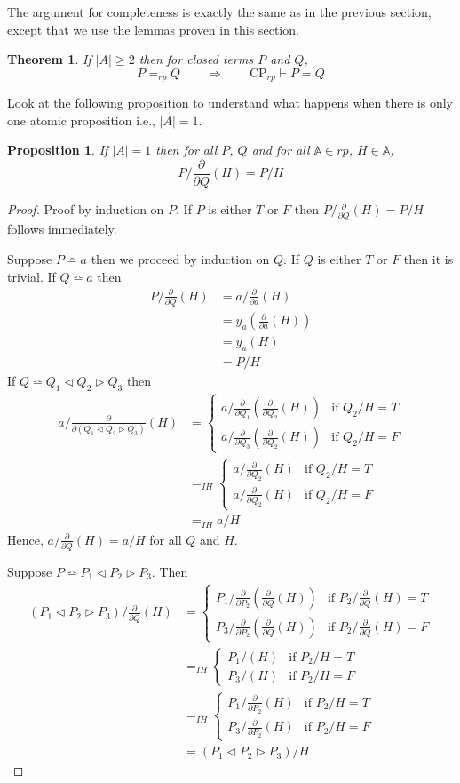\documentclass[a4paper,twoside,openright]{report}
\newcommand{\dd}[1]{\frac{\partial}{\partial #1}}
\newcommand{\syn}{\bumpeq}
\newcommand{\lef}{\ensuremath{\triangleleft}}
\newcommand{\rig}{\ensuremath{\triangleright}}
\newtheorem{prop}[theorem]{Proposition}
\newtheorem{thm}[theorem]{Theorem}
\begin{document}
The argument for completeness is exactly the same as in the previous section, except that we use the lemmas proven in this section.
\begin{thm}
If $|A|\ge 2$ then for closed terms $P$ and $Q$,
\[
P=_{rp}Q\qquad\Longrightarrow\qquad \text{CP}_{rp}\vdash P=Q
\]
\end{thm}

Look at the following proposition to understand what happens when there is only one atomic proposition i.e., $|A|=1$.
\begin{prop}\label{prop one}
If $|A|=1$ then for all $P$, $Q$ and for all $\mathbb{A}\in rp$, $H\in\mathbb{A}$,
\[
P/\dd Q(H) = P/H
\]
\end{prop}
\begin{proof}
Proof by induction on $P$. If $P$ is either $T$ or $F$ then $P/\dd Q(H)=P/H$ follows immediately.

Suppose $P\syn a$ then we proceed by induction on $Q$. If $Q$ is either $T$ or $F$ then it is trivial. If $Q\syn a$ then
\begin{align*}
P/\dd Q(H) &= a/\dd a(H)\\
&= y_a(\dd a(H))\\
&= y_a(H)\\
&= P/H
\end{align*}
If $Q\syn Q_1\lef Q_2\rig Q_3$ then
\begin{align*}
a/\dd{(Q_1\lef Q_2\rig Q_3)}(H)
&=\begin{cases}
a/\dd{Q_1}(\dd{Q_2}(H)) & \text{if $Q_2/H=T$}\\
a/\dd{Q_3}(\dd{Q_2}(H)) & \text{if $Q_2/H=F$}
\end{cases}\\
&=_{IH}\begin{cases}
a/\dd{Q_2}(H) & \text{if $Q_2/H=T$}\\
a/\dd{Q_2}(H) & \text{if $Q_2/H=F$}
\end{cases}\\
&=_{IH} a/H
\end{align*}
Hence, $a/\dd Q(H)=a/H$ for all $Q$ and $H$.

Suppose $P\syn P_1\lef P_2\rig P_3$. Then
\begin{align*}
(P_1\lef P_2\rig P_3)/\dd Q(H)
&=\begin{cases}
P_1/\dd{P_2}(\dd Q(H)) & \text{if $P_2/\dd Q(H)=T$}\\
P_3/\dd{P_2}(\dd Q(H)) & \text{if $P_2/\dd Q(H)=F$}
\end{cases}\\
&=_{IH}\begin{cases}
P_1/(H) & \text{if $P_2/H=T$}\\
P_3/(H) & \text{if $P_2/H=F$}
\end{cases}\\
&=_{IH}\begin{cases}
P_1/\dd{P_2}(H) & \text{if $P_2/H=T$}\\
P_3/\dd{P_2}(H) & \text{if $P_2/H=F$}
\end{cases}\\
&=(P_1\lef P_2\rig P_3)/H
\end{align*}
\end{proof}
\end{document}
